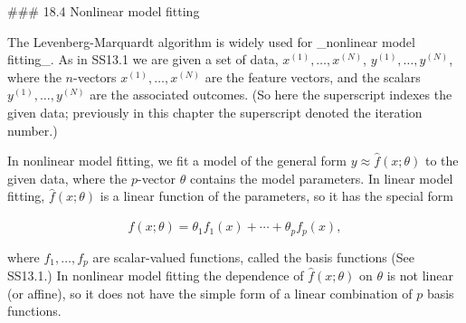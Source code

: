 

### 18.4 Nonlinear model fitting

The Levenberg-Marquardt algorithm is widely used for _nonlinear model fitting_. As in SS13.1 we are given a set of data, \(x^{(1)},\ldots,x^{(N)}\), \(y^{(1)},\ldots,y^{(N)}\), where the \(n\)-vectors \(x^{(1)},\ldots,x^{(N)}\) are the feature vectors, and the scalars \(y^{(1)},\ldots,y^{(N)}\) are the associated outcomes. (So here the superscript indexes the given data; previously in this chapter the superscript denoted the iteration number.)

In nonlinear model fitting, we fit a model of the general form \(y\approx\hat{f}(x;\theta)\) to the given data, where the \(p\)-vector \(\theta\) contains the model parameters. In linear model fitting, \(\hat{f}(x;\theta)\) is a linear function of the parameters, so it has the special form

\[\hat{f}(x;\theta)=\theta_{1}f_{1}(x)+\cdots+\theta_{p}f_{p}(x),\]

where \(f_{1},\ldots,f_{p}\) are scalar-valued functions, called the basis functions (See SS13.1.) In nonlinear model fitting the dependence of \(\hat{f}(x;\theta)\) on \(\theta\) is not linear (or affine), so it does not have the simple form of a linear combination of \(p\) basis functions.

